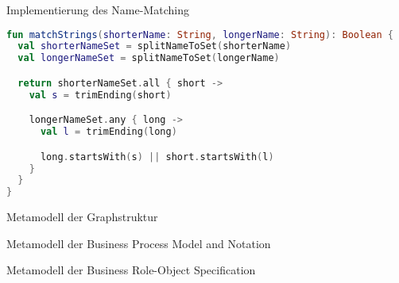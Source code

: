 \begin{frame}[fragile]{Implementierung des Name-Matching}
\begin{lstlisting}[language=Kotlin]
fun matchStrings(shorterName: String, longerName: String): Boolean {
  val shorterNameSet = splitNameToSet(shorterName)
  val longerNameSet = splitNameToSet(longerName)

  return shorterNameSet.all { short ->
    val s = trimEnding(short)

    longerNameSet.any { long ->
      val l = trimEnding(long)

      long.startsWith(s) || short.startsWith(l)
    }
  }
}
\end{lstlisting}
\end{frame}

\begin{frame}{Metamodell der Graphstruktur}
  
\end{frame}

\begin{frame}{Metamodell der Business Process Model and Notation}
  
\end{frame}

\begin{frame}{Metamodell der Business Role-Object Specification}
  
\end{frame}
